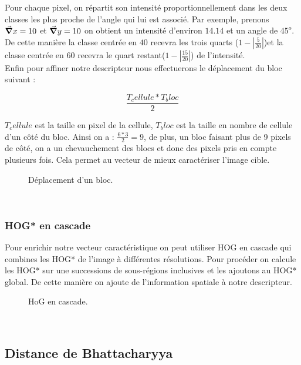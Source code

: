 Pour chaque pixel, on répartit son intensité proportionnellement dans les deux classes les plus proche de l'angle qui lui est associé. 
Par exemple, prenons $\grad x = 10$ et $\grad y = 10$ on obtient un intensité d'environ $14.14$ et un angle de $45^o$. De cette manière la classe centrée en $40$ recevra les trois quarts ($1 - |\frac{5}{20}|$)et la classe centrée en $60$ recevra le quart restant($1 - |\frac{15}{20}|$) de l'intensité.\\


Enfin pour affiner notre descripteur nous effectuerons le déplacement du bloc suivant :

\[ \frac{T_cellule * T_bloc}{2} \]

$T_cellule$ est la taille en pixel de la cellule,
$T_bloc$ est la taille en nombre de cellule d'un côté du bloc.
Ainsi on a : $\frac{6*3}{2} = 9$, de plus, un bloc faisant plus de 9 pixels de côté, on a un chevauchement des blocs et donc des pixels pris en compte plusieurs fois. Cela permet au vecteur de mieux caractériser l'image cible.

\begin{figure}[!htbp]
\center
\caption{Déplacement d'un bloc.}
\label{fig:blocOverlap}
\end{figure}
\\

\subsubsection{HOG* en cascade}

Pour enrichir notre vecteur caractéristique on peut utiliser HOG en cascade qui combines les HOG* de l'image à différentes résolutions. Pour procéder on calcule les HOG* sur une successions de sous-régions inclusives et les ajoutons au HOG* global. De cette manière on ajoute de l'information spatiale à notre descripteur.

\begin{figure}[!htbp]
\center
\caption{HoG en cascade.}
\label{fig:cuttlefish_hog}
\end{figure}
\\

\subsection{Distance de Bhattacharyya}


